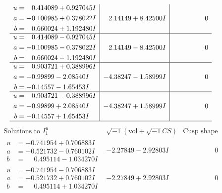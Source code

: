 \documentclass[1p]{elsarticle_modified}
\theoremstyle{definition}
\newcommand{\I}{\sqrt{-1}}
\begin{document}
$$\begin{array}{c|c|c}
\begin{aligned}
u &= \phantom{-}0.414089 + 0.927045 I \\
a &= -0.100985 + 0.378022 I \\
b &= \phantom{-}0.660024 + 1.192480 I\end{aligned}
 & \phantom{-}2.14149 + 8.42500 I & \phantom{-0.000000 } 0 \\ \hline\begin{aligned}
u &= \phantom{-}0.414089 - 0.927045 I \\
a &= -0.100985 - 0.378022 I \\
b &= \phantom{-}0.660024 - 1.192480 I\end{aligned}
 & \phantom{-}2.14149 - 8.42500 I & \phantom{-0.000000 } 0 \\ \hline\begin{aligned}
u &= \phantom{-}0.903721 + 0.388996 I \\
a &= -0.99899 - 2.08540 I \\
b &= -0.14557 - 1.65453 I\end{aligned}
 & -4.38247 - 1.58999 I & \phantom{-0.000000 } 0 \\ \hline\begin{aligned}
u &= \phantom{-}0.903721 - 0.388996 I \\
a &= -0.99899 + 2.08540 I \\
b &= -0.14557 + 1.65453 I\end{aligned}
 & -4.38247 + 1.58999 I & \phantom{-0.000000 } 0\\
 \hline 
 \end{array}$$\newpage$$\begin{array}{c|c|c}  
\text{Solutions to }I^u_{1}& \I (\text{vol} + \sqrt{-1}CS) & \text{Cusp shape}\\
 \hline 
\begin{aligned}
u &= -0.741954 + 0.706883 I \\
a &= -0.521732 - 0.760102 I \\
b &= \phantom{-}0.495114 - 1.034270 I\end{aligned}
 & -2.27849 - 2.92803 I & \phantom{-0.000000 } 0 \\ \hline\begin{aligned}
u &= -0.741954 - 0.706883 I \\
a &= -0.521732 + 0.760102 I \\
b &= \phantom{-}0.495114 + 1.034270 I\end{aligned}
 & -2.27849 + 2.92803 I & \phantom{-0.000000 } 0 \\ \hline\begin{aligned}

\end{aligned}
\end{array}$$
\end{document}
